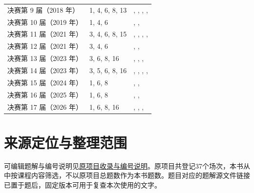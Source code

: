 \documentclass[12pt,fontset=fandol]{ctexart}
\begin{document}
\begin{longtable}{p{}p{}p{}}
决赛第 9 届（2018 年） & 1, 4, 6, 8, 13 & \pageref{ex:fin09-hi:1}, \pageref{ex:fin09-hi:4}, \pageref{ex:fin09-hi:6}, \pageref{ex:fin09-lo:8}, \pageref{ex:fin09-hi:11}\\

决赛第 10 届（2019 年） & 1, 4, 6 & \pageref{ex:fin10-hi:1}, \pageref{ex:fin10-hi:4}, \pageref{ex:fin10-hi:6}\\

决赛第 11 届（2021 年） & 3, 4, 6, 8, 15 & \pageref{ex:fin11-high:3}, \pageref{ex:fin11-high:4}, \pageref{ex:fin11-high:6}, \pageref{ex:fin11-low:8}, \pageref{ex:fin11-high:13}\\

决赛第 12 届（2021 年） & 3, 4, 6 & \pageref{ex:fin12-high:3}, \pageref{ex:fin12-high:4}, \pageref{ex:fin12-high:6}\\

决赛第 13 届（2023 年） & 3, 6, 8, 16 & \pageref{ex:fin13-high:3}, \pageref{ex:fin13-high:6}, \pageref{ex:fin13-low:8}, \pageref{ex:fin13-high:13}\\

决赛第 14 届（2023 年） & 3, 5, 6, 8, 16 & \pageref{ex:fin14-high:3}, \pageref{ex:fin14-high:5}, \pageref{ex:fin14-high:6}, \pageref{ex:fin14-low:8}, \pageref{ex:fin14-high:13}\\

决赛第 15 届（2024 年） & 1, 6, 8 & \pageref{ex:fin15-high:1}, \pageref{ex:fin15-high:6}, \pageref{ex:fin15-low:8}\\

决赛第 16 届（2025 年） & 1, 6, 8 & \pageref{ex:fin16-high:1}, \pageref{ex:fin16-high:6}, \pageref{ex:fin16-low:8}\\

决赛第 17 届（2026 年） & 1, 6, 8, 16 & \pageref{ex:fin17-high:1}, \pageref{ex:fin17-high:6}, \pageref{ex:fin17-low:6}, \pageref{ex:fin17-high:13}\\

\bottomrule\end{longtable}

\section{来源定位与整理范围}

可编辑题解与编号说明见\href{https://github.com/lzxcr/cmc-mathematics/blob/64916fa1fdbc3e444a652eca204d5669058ee321/docs/COVERAGE.md}{原项目收录与编号说明}。原项目共登记37个场次，本书从中按课程内容筛选，不以原项目总题数作为本书题数。题目对应的题解源文件链接已置于题后，固定版本可用于复查本次使用的文字。
\end{document}
